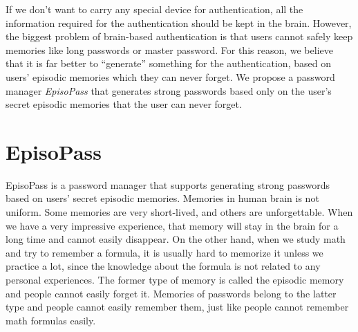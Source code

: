 \documentclass{article}
\begin{document}
If we don't want to carry any special device for authentication,
all the information required for the authentication should be
kept in the brain.
%
However, the biggest problem of brain-based authentication is that
users cannot safely keep memories like long passwords or master password.
For this reason, we believe that
it is far better to ``generate'' something for the authentication,
based on users' episodic memories which they can never forget.
%
%
We propose a password manager \textit{EpisoPass} that generates strong passwords
based only on the user's secret episodic memories that the user can never forget.

\section{EpisoPass}

EpisoPass is a password manager that supports generating
strong passwords based on users' secret episodic memories.
%
%
Memories in human brain is not uniform.
Some memories are very short-lived, and others are unforgettable.
When we have a very impressive experience,
that memory will stay in the brain for a long time and
cannot easily disappear.
On the other hand, when we study math and try to remember a formula,
it is usually hard to memorize it unless we practice a lot,
since the knowledge about the formula is not related to
any personal experiences.
The former type of memory is called the episodic memory and
people cannot easily forget it.
Memories of passwords belong to the latter type and
people cannot easily remember them, just like people cannot
remember math formulas easily.
%
\end{document}
